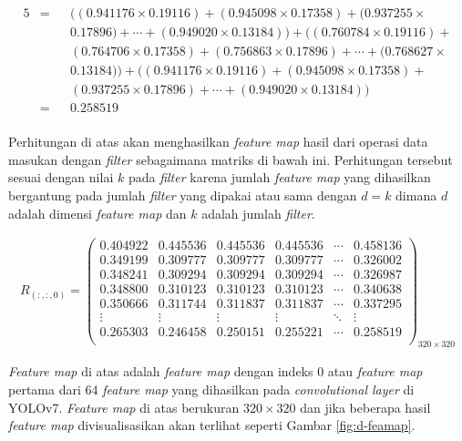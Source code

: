 \begin{alignat*}{5}
                        &=  &&\bigl( (0.941176\times 0.19116) + (0.945098\times 0.17358) + (0.937255\times \\
                        &   &&0.17896) + \cdots + (0.949020\times 0.13184) \bigr) + \bigl( (0.760784\times 0.19116) + \\
                        &   &&(0.764706\times 0.17358) + (0.756863\times 0.17896) + \cdots + (0.768627\times \\
                        &   &&0.13184) \bigr) + \bigl( (0.941176\times 0.19116) + (0.945098\times 0.17358) + \\
                        &   &&(0.937255\times 0.17896) + \cdots + (0.949020\times 0.13184) \bigr) \\
                        &=  &&0.258519 \\
    \end{alignat*}

    Perhitungan di atas akan menghasilkan \textit{feature map} hasil dari operasi data masukan dengan \textit{filter} sebagaimana matriks di bawah ini. Perhitungan tersebut sesuai dengan nilai $k$ pada \textit{filter} karena jumlah \textit{feature map} yang dihasilkan bergantung pada jumlah \textit{filter} yang dipakai atau sama dengan $d=k$ dimana $d$ adalah dimensi \textit{feature map} dan $k$ adalah jumlah \textit{filter}.

    \begin{align*}
        R_{(:, :, 0)} = 
        \begin{pmatrix}
            0.404922 & 0.445536 & 0.445536 & 0.445536 & \cdots & 0.458136 \\
            0.349199 & 0.309777 & 0.309777 & 0.309777 & \cdots & 0.326002 \\
            0.348241 & 0.309294 & 0.309294 & 0.309294 & \cdots & 0.326987 \\
            0.348800 & 0.310123 & 0.310123 & 0.310123 & \cdots & 0.340638 \\
            0.350666 & 0.311744 & 0.311837 & 0.311837 & \cdots & 0.337295 \\
            \vdots   & \vdots   & \vdots   & \vdots   & \ddots &\vdots \\
            0.265303 & 0.246458 & 0.250151 & 0.255221 & \cdots & 0.258519 \\
        \end{pmatrix}_{320\times 320}
    \end{align*}

    \textit{Feature map} di atas adalah \textit{feature map} dengan indeks 0 atau \textit{feature map} pertama dari 64 \textit{feature map} yang dihasilkan pada \textit{convolutional layer} di YOLOv7. \textit{Feature map} di atas berukuran $320\times 320$ dan jika beberapa hasil \textit{feature map} divisualisasikan akan terlihat seperti Gambar \ref{fig:d-feamap}.

